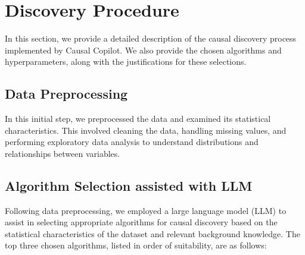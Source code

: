 \documentclass{article}
\begin{document}
\section{Discovery Procedure}
In this section, we provide a detailed description of the causal discovery process implemented by Causal Copilot. 
We also provide the chosen algorithms and hyperparameters, along with the justifications for these selections.

\subsection{Data Preprocessing}
In this initial step, we preprocessed the data and examined its statistical characteristics. 
This involved cleaning the data, handling missing values, and performing exploratory data analysis to understand distributions and relationships between variables.

\subsection{Algorithm Selection assisted with LLM}
Following data preprocessing, we employed a large language model (LLM) to assist in 
selecting appropriate algorithms for causal discovery based on the statistical characteristics of the dataset and relevant background knowledge. 
The top three chosen algorithms, listed in order of suitability, are as follows:   
\end{document}
